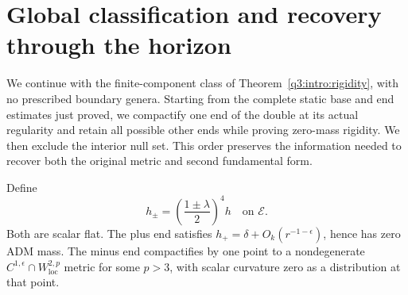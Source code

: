 \section{Global classification and recovery through the horizon}
\label{q3:global:section}

We continue with the finite-component class of
Theorem~\ref{q3:intro:rigidity}, with no prescribed boundary genera.
Starting from the complete static base and end estimates just proved,
we compactify one end of the double at its actual regularity and retain
all possible other ends while proving zero-mass rigidity. We then exclude the
interior null set.  This order preserves the information needed to
recover both the original metric and second fundamental form.

\begin{lemma}
\label{q3:static:conformal-completion}
Define
\[
h_\pm=\left(\frac{1\pm\lambda}{2}\right)^4h
\quad\text{on }\mathcal E.
\]
Both are scalar flat. The plus end satisfies
\(h_+=\delta+O_k(r^{-1-\epsilon})\), hence has zero ADM mass.
The minus end compactifies by one point to a nondegenerate
\(C^{1,\epsilon}\cap W^{2,p}_{\mathrm{loc}}\) metric for some
\(p>3\), with scalar curvature zero as a distribution at that point.
\end{lemma}

